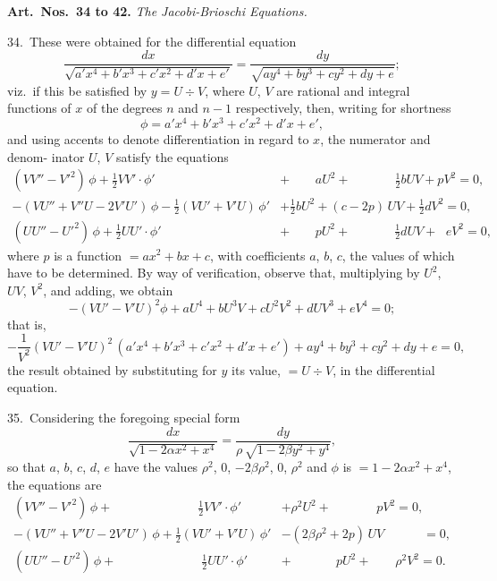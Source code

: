 \documentclass[12pt,a4paper]{article}
\theoremstyle{definition}
\begin{document}
\newpage
\noindent\textbf{Art.\ Nos.\ 34 to 42.} \textit{The Jacobi-Brioschi Equations.}

34.\ These were obtained for the differential equation
\[
\frac{dx}{\sqrt{a'x^4 + b'x^3 + c'x^2 + d'x + e'}}
= \frac{dy}{\sqrt{ay^4 + by^3 + cy^2 + dy + e}};
\]
viz.\ if this be satisfied by $y = U \div V$, where $U$, $V$ are rational and integral functions
of $x$ of the degrees $n$ and $n-1$ respectively, then, writing for shortness
\[
\phi = a'x^4 + b'x^3 + c'x^2 + d'x + e',
\]
and using accents to denote differentiation in regard to $x$, the numerator and denom-
inator $U$, $V$ satisfy the equations
\begin{align*}
(VV'' - V'^2)\, \phi + \tfrac12 VV' \cdot \phi' \phantom{{} + aU^2 \;}
&+ \phantom{(c-{}} aU^2 + \phantom{{}\tfrac12 dUV +{}} \tfrac12 bUV + pV^2 = 0,\\
-(VU'' + V''U - 2V'U')\, \phi - \tfrac12(VU' + V'U)\, \phi'
&+ \tfrac12 bU^2 + (c - 2p)\, UV + \tfrac12 dV^2 = 0,\\
(UU'' - U'^2)\, \phi + \tfrac12 UU' \cdot \phi' \phantom{{} + pU^2 \;}
&+ \phantom{(c-{}} pU^2 + \phantom{{}\tfrac12 dUV +{}} \tfrac12 dUV + \phantom{{}c\,} eV^2 = 0,
\end{align*}
where $p$ is a function $= ax^2 + bx + c$, with coefficients $a$, $b$, $c$, the values of which have
to be determined. By way of verification, observe that, multiplying by $U^2$, $UV$, $V^2$,
and adding, we obtain
\[
-(VU' - V'U)^2 \phi + aU^4 + bU^3V + cU^2V^2 + dUV^3 + eV^4 = 0;
\]
that is,
\[
-\frac{1}{V^2}(VU' - V'U)^2\, (a'x^4 + b'x^3 + c'x^2 + d'x + e')
+ ay^4 + by^3 + cy^2 + dy + e = 0,
\]
the result obtained by substituting for $y$ its value, $= U \div V$, in the differential equation.

35.\ Considering the foregoing special form
\[
\frac{dx}{\sqrt{1 - 2\alpha x^2 + x^4}}
= \frac{dy}{\rho\, \sqrt{1 - 2\beta y^2 + y^4}},
\]
so that $a$, $b$, $c$, $d$, $e$ have the values $\rho^2$, $0$, $-2\beta\rho^2$, $0$, $\rho^2$ and $\phi$ is $= 1 - 2\alpha x^2 + x^4$, the
equations are
\begin{align*}
(VV'' - V'^2)\, \phi + \phantom{{}\tfrac12(VU'+V'U)\,} \tfrac12 VV' \cdot \phi'
&+ \rho^2 U^2 + \phantom{(2\beta\rho^2+{}} pV^2 = 0,\\
-(VU'' + V''U - 2V'U')\, \phi + \tfrac12(VU' + V'U)\, \phi'
&- (2\beta\rho^2 + 2p)\, UV \phantom{{}+ \rho^2V^2} = 0,\\
(UU'' - U'^2)\, \phi + \phantom{{}\tfrac12(VU'+V'U)\,} \tfrac12 UU' \cdot \phi'
&+ \phantom{(2\beta\rho^2+{}} pU^2 + \phantom{{}\rho^2V^2} \rho^2 V^2 = 0.
\end{align*}
\end{document}
